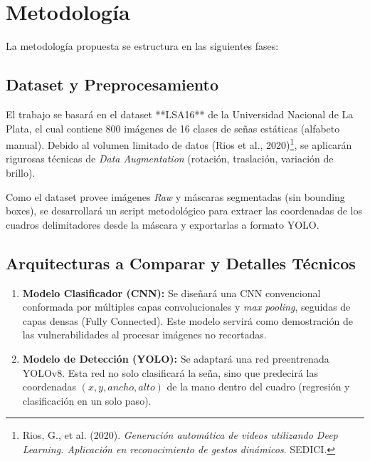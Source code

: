 \documentclass[a4paper,12pt]{article}
\begin{document}
\section{Metodología}

La metodología propuesta se estructura en las siguientes fases:

\subsection{Dataset y Preprocesamiento}
El trabajo se basará en el dataset **LSA16** de la Universidad Nacional de La Plata, el cual contiene 800 imágenes de 16 clases de señas estáticas (alfabeto manual). Debido al volumen limitado de datos (Rios et al., 2020)\footnote{Rios, G., et al. (2020). \textit{Generación automática de videos utilizando Deep Learning. Aplicación en reconocimiento de gestos dinámicos}. SEDICI.}, se aplicarán rigurosas técnicas de \textit{Data Augmentation} (rotación, traslación, variación de brillo). 

Como el dataset provee imágenes \textit{Raw} y máscaras segmentadas (sin bounding boxes), se desarrollará un script metodológico para extraer las coordenadas de los cuadros delimitadores desde la máscara y exportarlas a formato YOLO.

\subsection{Arquitecturas a Comparar y Detalles Técnicos}
\begin{enumerate}
    \item \textbf{Modelo Clasificador (CNN):} Se diseñará una CNN convencional conformada por múltiples capas convolucionales y \textit{max pooling}, seguidas de capas densas (Fully Connected). Este modelo servirá como demostración de las vulnerabilidades al procesar imágenes no recortadas.
    \item \textbf{Modelo de Detección (YOLO):} Se adaptará una red preentrenada YOLOv8. Esta red no solo clasificará la seña, sino que predecirá las coordenadas $(x, y, ancho, alto)$ de la mano dentro del cuadro (regresión y clasificación en un solo paso).
\end{enumerate}
\end{document}
